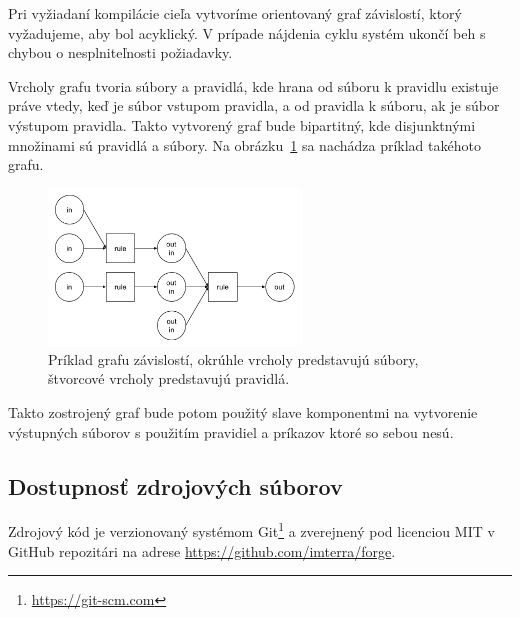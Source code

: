 Pri vyžiadaní kompilácie cieľa vytvoríme orientovaný graf závislostí, ktorý vyžadujeme,
aby bol acyklický. V prípade nájdenia cyklu systém ukončí beh s chybou o nesplniteľnosti
požiadavky.

Vrcholy grafu tvoria súbory a pravidlá, kde hrana od súboru k pravidlu existuje
práve vtedy, keď je súbor vstupom pravidla, a od pravidla k súboru, ak je súbor
výstupom pravidla. Takto vytvorený graf bude bipartitný, kde disjunktnými množinami
sú pravidlá a súbory. Na obrázku~\ref{img:dependency_graph} sa nachádza príklad
takéhoto grafu.

\begin{figure}[h]
  \centerline{\includegraphics[width=0.6\textwidth]{images/dependency_graph}}
  \caption[Graf závislostí]{Príklad grafu závislostí, okrúhle vrcholy predstavujú
  súbory, štvorcové vrcholy predstavujú pravidlá.}
  \label{img:dependency_graph}
\end{figure}

Takto zostrojený graf bude potom použitý slave komponentmi na vytvorenie výstupných
súborov s použitím pravidiel a príkazov ktoré so sebou nesú.

\newpage

\subsection{Dostupnosť zdrojových súborov}
\label{sub:solution:source}
Zdrojový kód je verzionovaný systémom Git\footnote{\url{https://git-scm.com}} a
zverejnený pod licenciou MIT v GitHub repozitári na adrese \url{https://github.com/imterra/forge}.
